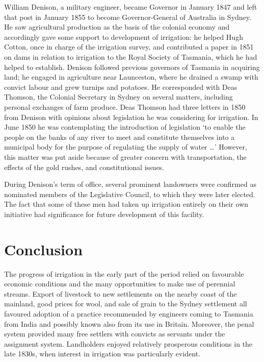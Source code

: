 William Denison, a military engineer, became Governor in January 1847
and left that post in January 1855 to become Governor-General of
Australia in Sydney.  He saw agricultural production as the basis of
the colonial economy and accordingly gave some support to development
of irrigation: he helped Hugh Cotton, once in charge of the irrigation
survey, and contributed a paper in 1851 on dams in relation to
irrigation to the Royal Society of Tasmania, which he had helped to
establish.  Denison followed previous governors of Tasmania in
acquiring land; he engaged in agriculture near Launceston, where he
drained a swamp with convict labour and grew turnips and
potatoes.  He corresponded with Deas Thomson, the Colonial Secretary
in Sydney on several matters, including personal exchanges of farm
produce.  Deas Thomson had three letters in 1850 from Denison with
opinions about legislation he was considering for irrigation.  In June
1850 he was contemplating the introduction of legislation `to enable
the people on the banks of any river to meet and constitute themselves
into a municipal body for the purpose of regulating the supply of
water \ldots'  However, this matter was put aside because of greater
concern with transportation, the effects of the gold rushes, and
constitutional issues.

During Denison's term of office, several prominent landowners were
confirmed as nominated members of the Legislative Council, to which
they were later elected.  The fact that some of these men had taken up
irrigation entirely on their own initiative had significance for
future development of this facility.

\section*{Conclusion}

The progress of irrigation in the early part of the period relied on
favourable economic conditions and the many opportunities to make use
of perennial streams.  Export of livestock to new settlements on the
nearby coast of the mainland, good prices for wool, and sale of grain
to the Sydney settlement all favoured adoption of a practice
recommended by engineers coming to Tasmania from India and possibly
known also from its use in Britain.  Moreover, the penal system
provided many free settlers with convicts as servants under the
assignment system.  Landholders enjoyed relatively prosperous
conditions in the late 1830s, when interest in irrigation was
particularly evident.

